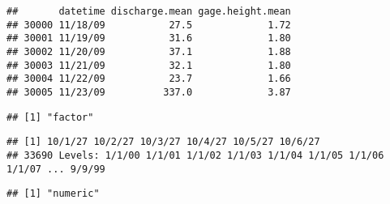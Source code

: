 \documentclass[]{article}
\newenvironment{Shaded}{\begin{snugshade}}{\end{snugshade}}
\newcommand{\CommentTok}[1]{\textcolor[rgb]{0.56,0.35,0.01}{\textit{#1}}}
\newcommand{\KeywordTok}[1]{\textcolor[rgb]{0.13,0.29,0.53}{\textbf{#1}}}
\newcommand{\NormalTok}[1]{#1}
\newcommand{\OperatorTok}[1]{\textcolor[rgb]{0.81,0.36,0.00}{\textbf{#1}}}
\begin{document}
\begin{verbatim}
##       datetime discharge.mean gage.height.mean
## 30000 11/18/09           27.5             1.72
## 30001 11/19/09           31.6             1.80
## 30002 11/20/09           37.1             1.88
## 30003 11/21/09           32.1             1.80
## 30004 11/22/09           23.7             1.66
## 30005 11/23/09          337.0             3.87
\end{verbatim}

\begin{Shaded}
\end{Shaded}

\begin{verbatim}
## [1] "factor"
\end{verbatim}

\begin{Shaded}
\end{Shaded}

\begin{verbatim}
## [1] 10/1/27 10/2/27 10/3/27 10/4/27 10/5/27 10/6/27
## 33690 Levels: 1/1/00 1/1/01 1/1/02 1/1/03 1/1/04 1/1/05 1/1/06 1/1/07 ... 9/9/99
\end{verbatim}

\begin{Shaded}
\end{Shaded}

\begin{verbatim}
## [1] "numeric"
\end{verbatim}

\begin{Shaded}
\end{Shaded}
\end{document}
